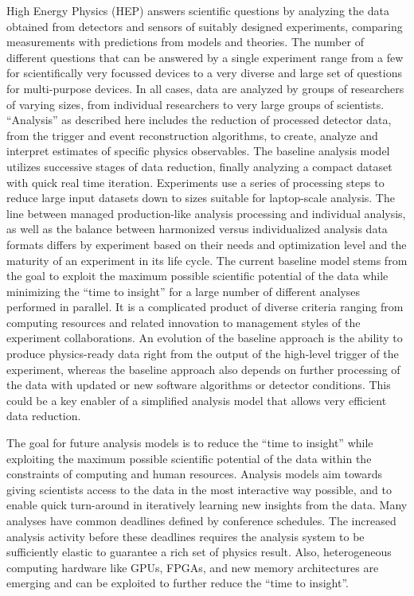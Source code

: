 \documentclass[12pt,a4paper]{article}
\begin{document}
High Energy Physics (HEP) answers scientific questions by analyzing the data obtained from detectors and sensors of suitably designed experiments, comparing measurements with predictions from models and theories. The number of different questions that can be answered by a single experiment range from a few for scientifically very focussed devices to a very diverse and large set of questions for multi-purpose devices. In all cases, data are analyzed by groups of researchers of varying sizes, from individual researchers to very large groups of scientists. ``Analysis'' as described here includes the reduction of processed detector data, from the trigger and event reconstruction algorithms, to create, analyze and interpret estimates of specific physics observables. The baseline analysis model utilizes successive stages of data reduction, finally analyzing a compact dataset with quick real time iteration. Experiments use a series of processing steps to reduce large input datasets down to sizes suitable for laptop-scale analysis. The line between managed production-like analysis processing and individual analysis, as well as the balance between harmonized versus individualized analysis data formats differs by experiment based on their needs and optimization level and the maturity of an experiment in its life cycle. The current baseline model stems from the goal to exploit the maximum possible scientific potential of the data while minimizing the ``time to insight'' for a large number of different analyses performed in parallel. It is a complicated product of diverse criteria ranging from computing resources and related innovation to management styles of the experiment collaborations. An evolution of the baseline approach is the ability to produce physics-ready data right from the output of the high-level trigger of the experiment, whereas the baseline approach also depends on further processing of the data with updated or new software algorithms or detector conditions. This could be a key enabler of a simplified analysis model that allows very efficient data reduction.

The goal for future analysis models is to reduce the ``time to insight'' while exploiting the maximum possible scientific potential of the data within the constraints of computing and human resources. Analysis models aim towards giving scientists access to the data in the most interactive way possible, and to enable quick turn-around in iteratively learning new insights from the data. Many analyses have common deadlines defined by conference schedules. The increased analysis activity before these deadlines requires the analysis system to be sufficiently elastic to guarantee a rich set of physics result. Also, heterogeneous computing hardware like GPUs, FPGAs, and new memory architectures are emerging and can be exploited to further reduce the ``time to insight''.
\end{document}

